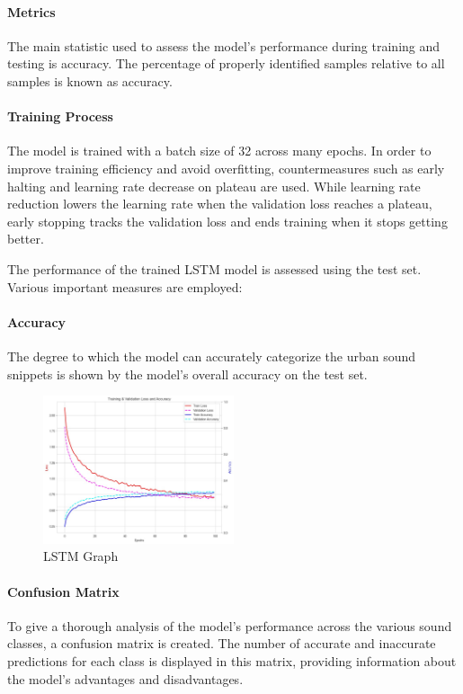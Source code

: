 \documentclass[conference]{IEEEtran}
\begin{document}
\paragraph{Metrics}
The main statistic used to assess the model's performance during training and testing is accuracy. The percentage of properly identified samples relative to all samples is known as accuracy.

\paragraph{Training Process}
The model is trained with a batch size of 32 across many epochs. In order to improve training efficiency and avoid overfitting, countermeasures such as early halting and learning rate decrease on plateau are used. While learning rate reduction lowers the learning rate when the validation loss reaches a plateau, early stopping tracks the validation loss and ends training when it stops getting better.

The performance of the trained LSTM model is assessed using the test set. Various important measures are employed:


\paragraph{Accuracy}
The degree to which the model can accurately categorize the urban sound snippets is shown by the model's overall accuracy on the test set.


\begin{figure}[htbp]
\centerline{\includegraphics[width=0.5\textwidth]{Images/LSTMgraph.png}}
\caption{LSTM Graph}
\label{fig:LSTMgraph}
\end{figure}

\paragraph{Confusion Matrix}
To give a thorough analysis of the model's performance across the various sound classes, a confusion matrix is created. The number of accurate and inaccurate predictions for each class is displayed in this matrix, providing information about the model's advantages and disadvantages.
\end{document}
